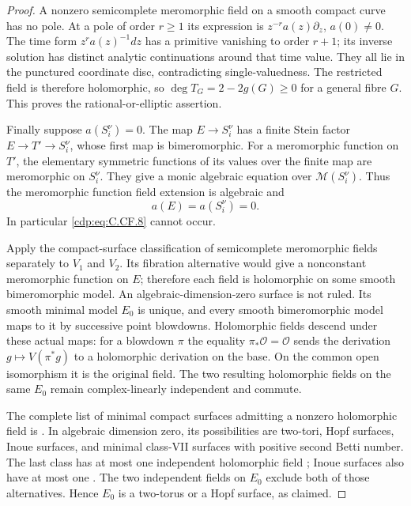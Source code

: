 \begin{proof}
A nonzero semicomplete meromorphic field on a smooth
compact curve has no pole. At a pole of order $r\ge1$
its expression is $z^{-r}a(z)\partial_z$, $a(0)\ne0$.
The time form $z^r a(z)^{-1}dz$ has a primitive
vanishing to order $r+1$; its inverse solution has
distinct analytic continuations around that time
value. They all lie in the punctured coordinate
disc, contradicting single-valuedness. The restricted
field is therefore holomorphic, so
$\deg T_G=2-2g(G)\ge0$ for a general fibre $G$.
This proves the rational-or-elliptic assertion.

Finally suppose $a(S_i^\nu)=0$. The map
$E\to S_i^\nu$ has a finite Stein factor
$E\to T'\to S_i^\nu$, whose first map is
bimeromorphic. For a meromorphic function on $T'$, the
elementary symmetric functions of its values over
the finite map are meromorphic on $S_i^\nu$.
They give a monic algebraic equation over
$\mathcal M(S_i^\nu)$. Thus the meromorphic function
field extension is algebraic and
\[
                            a(E)=a(S_i^\nu)=0.
 \tag{C.CF.9}\label{cdp:eq:C.CF.9}
\]
In particular \eqref{cdp:eq:C.CF.8} cannot occur.

Apply the compact-surface classification of semicomplete
meromorphic fields \cite[Theorem~9.2]{Guillot2024}
separately to $V_1$ and $V_2$. Its fibration alternative
would give a nonconstant meromorphic function on $E$;
therefore each field is holomorphic on some smooth
bimeromorphic model. An algebraic-dimension-zero
surface is not ruled. Its smooth minimal model $E_0$
is unique, and every smooth bimeromorphic model maps
to it by successive point blowdowns. Holomorphic
fields descend under these actual maps: for a
blowdown $\pi$ the equality
$\pi_*\mathcal O=\mathcal O$ sends the derivation
$g\mapsto V(\pi^*g)$ to a holomorphic derivation on
the base. On the common open isomorphism it is the
original field. The two resulting holomorphic fields
on the same $E_0$ remain complex-linearly independent
and commute.

The complete list of minimal compact surfaces
admitting a nonzero holomorphic field is
\cite[Theorem~0.3]{DOT2001}. In algebraic dimension
zero, its possibilities are two-tori, Hopf surfaces,
Inoue surfaces, and minimal class-VII surfaces with
positive second Betti number. The last class has
at most one independent holomorphic field
\cite[pp.~256 and~260]{DOT2000}; Inoue surfaces
also have at most one
\cite[Propositions~2(ii), 3(ii) and~5]{Inoue1974}.
The two independent fields on $E_0$ exclude both
of those alternatives. Hence $E_0$ is a two-torus
or a Hopf surface, as claimed.
\end{proof}


